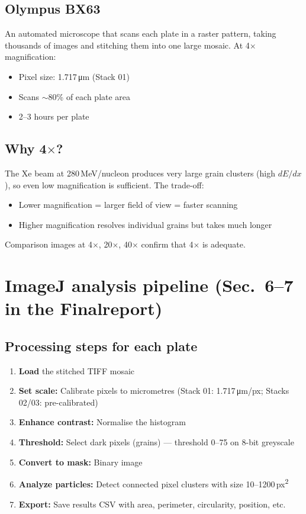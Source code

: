 \documentclass[12pt,a4paper]{article}
\begin{document}
\subsection{Olympus BX63}

An automated microscope that scans each plate in a raster pattern,
taking thousands of images and stitching them into one large mosaic.
At 4$\times$ magnification:
\begin{itemize}
  \item Pixel size: 1.717\,\si{\micro\meter} (Stack 01)
  \item Scans $\sim$80\% of each plate area
  \item 2--3 hours per plate
\end{itemize}

\subsection{Why 4$\times$?}

The Xe beam at 280\,MeV/nucleon produces very large grain clusters
(high $dE/dx$), so even low magnification is sufficient. The trade-off:
\begin{itemize}
  \item Lower magnification = larger field of view = faster scanning
  \item Higher magnification resolves individual grains but takes
        much longer
\end{itemize}
Comparison images at 4$\times$, 20$\times$, 40$\times$ confirm that
4$\times$ is adequate.

\section{ImageJ analysis pipeline (Sec.~6--7 in the Finalreport)}

\subsection{Processing steps for each plate}

\begin{enumerate}
  \item \textbf{Load} the stitched TIFF mosaic
  \item \textbf{Set scale:} Calibrate pixels to micrometres
        (Stack 01: 1.717\,\si{\micro\meter}/px; Stacks 02/03:
        pre-calibrated)
  \item \textbf{Enhance contrast:} Normalise the histogram
  \item \textbf{Threshold:} Select dark pixels (grains) --- threshold
        0--75 on 8-bit greyscale
  \item \textbf{Convert to mask:} Binary image
  \item \textbf{Analyze particles:} Detect connected pixel clusters
        with size 10--1200\,px\textsuperscript{2}
  \item \textbf{Export:} Save results CSV with area, perimeter,
        circularity, position, etc.
\end{enumerate}
\end{document}
